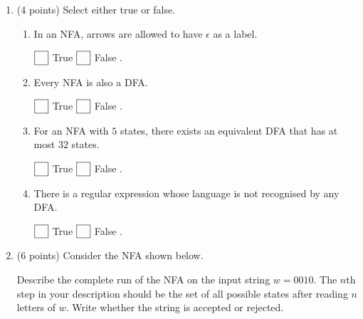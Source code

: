 \documentclass{amsart}
\begin{document}
\begin{enumerate}
\item (4 points) Select either true or false. 
\begin{enumerate}
\item In an NFA, arrows are allowed to have \(\epsilon\) as a label.

\hfill \(\fbox{\phantom X}\) True \hfill \(\fbox{\phantom X}\) False \hfill.

\item Every NFA is also a DFA.

\hfill \(\fbox{\phantom X}\) True \hfill \(\fbox{\phantom X}\) False \hfill.

\item For an NFA with \(5\) states, there exists an equivalent DFA that has at most \(32\) states.

\hfill \(\fbox{\phantom X}\) True \hfill \(\fbox{\phantom X}\) False \hfill.

\item There is a regular expression whose language is not recognised by any DFA.

\hfill \(\fbox{\phantom X}\) True \hfill \(\fbox{\phantom X}\) False \hfill.
\end{enumerate}

\item (6 points) Consider the NFA shown below.
\begin{center}
\end{center}
Describe the complete run of the NFA on the input string \(w = 0010\).
The \(n\)th step in your description should be the set of all possible states after reading \(n\) letters of \(w\).
Write whether the string is accepted or rejected.
\begin{workbox}
\vspace{7.5cm}
\end{workbox}
\end{enumerate}
\end{document}
